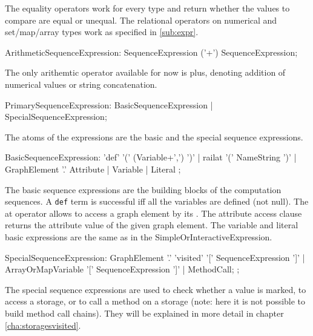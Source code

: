 The equality operators work for every type and return whether the values to compare are equal or unequal.
The relational operators on numerical and set/map/array types work as specified in \ref{sub:expr}.

\begin{rail}
  ArithmeticSequenceExpression:
    SequenceExpression ('+') SequenceExpression;
\end{rail}

The only arithemtic operator available for now is plus, denoting addition of numerical values or string concatenation.

\begin{rail}
  PrimarySequenceExpression:
    BasicSequenceExpression |
    SpecialSequenceExpression;
\end{rail}

The atoms of the expressions are the basic and the special sequence expressions.

\begin{rail}
  BasicSequenceExpression:
    'def' '(' (Variable+',') ')' |
	  railat '(' NameString ')' |
 	  GraphElement '.' Attribute |
	  Variable | 
    Literal
  ;
\end{rail}

The basic sequence expressions are the building blocks of the computation sequences.
A \texttt{def} term is successful iff all the variables are defined (not null).
The at operator allows to access a graph element by its .
The attribute access clause returns the attribute value of the given graph element.
The variable and literal basic expressions are the same as in the SimpleOrInteractiveExpression.

\begin{rail}
  SpecialSequenceExpression:
    GraphElement '.' 'visited' '[' SequenceExpression ']' |
    ArrayOrMapVariable '[' SequenceExpression ']' |
    MethodCall;
  ;
\end{rail}

The special sequence expressions are used to check whether a value is marked, to access a storage, or to call a method on a storage (note: here it is not possible to build method call chains). 
They will be explained in more detail in chapter \ref{cha:storagesvisited}.



